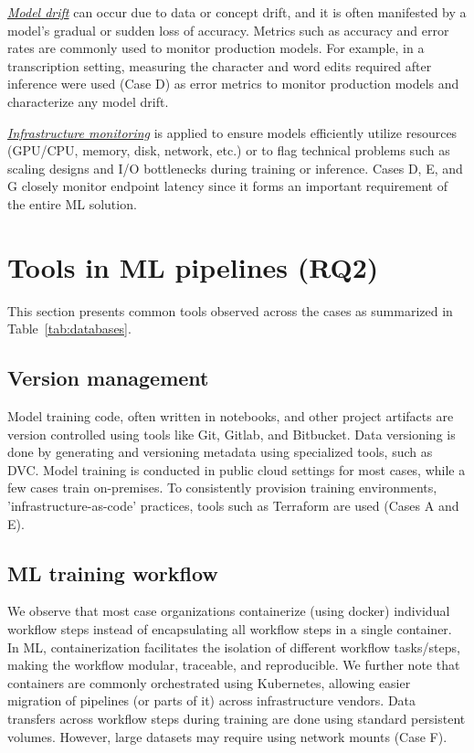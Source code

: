 \documentclass{IEEEcsmag}
\begin{document}
\underline{\emph{Model drift}} can occur due to data or concept drift, and it is often manifested by a model's gradual or sudden loss of accuracy. Metrics such as accuracy and error rates are commonly used to monitor production models. For example, in a transcription setting, measuring the character and word edits required after inference were used (Case D) as error metrics to monitor production models and characterize any model drift.

\underline{\emph{Infrastructure monitoring}}
is applied to ensure models efficiently utilize resources (GPU/CPU, memory, disk, network, etc.) or to flag technical problems such as scaling designs and I/O bottlenecks during training or inference. Cases D, E, and G closely monitor endpoint latency since it forms an important requirement of the entire ML solution.



 





 



\section{\textbf{Tools in ML pipelines (RQ2)}}
\label{sec:tools}


This section presents common tools observed across the cases as summarized in Table~\ref{tab:databases}.



\subsection{Version management}
Model training code, often written in notebooks, and other project artifacts are version controlled using tools like Git, Gitlab, and Bitbucket. Data versioning is done by generating and versioning metadata using specialized tools, such as DVC. 
Model training is conducted in public cloud settings for most cases, while a few cases train on-premises. To consistently provision training environments, 'infrastructure-as-code' practices, tools such as Terraform are used (Cases A and E).


\subsection{ML training workflow}
We observe that most case organizations containerize (using docker) individual workflow steps instead of encapsulating all workflow steps in a single container. In ML, containerization facilitates the isolation of different workflow tasks/steps, making the workflow modular, traceable, and reproducible. We further note that containers are commonly orchestrated using Kubernetes, allowing easier migration of pipelines (or parts of it) across infrastructure vendors. Data transfers across workflow steps during training are done using standard persistent volumes. However, large datasets may require using network mounts (Case F).
\end{document}
